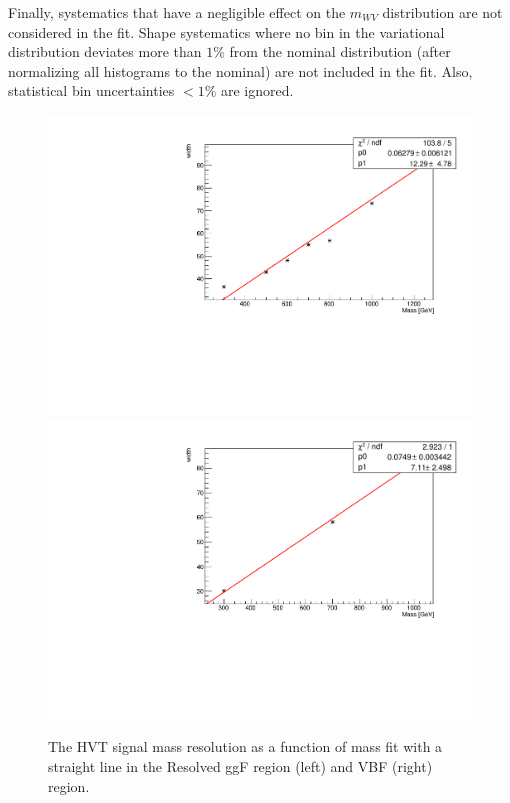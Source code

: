 Finally, systematics that have a negligible effect on the $m_{WV}$ distribution are not considered in the fit. Shape systematics where no bin in the variational distribution deviates more than $1\%$ from the nominal distribution (after normalizing all histograms to the nominal) are not included in the fit. Also, statistical bin uncertainties $< 1\%$ are ignored. 

\begin{figure}[h!]
  \centering
  \includegraphics[width=0.48\hsize]{figures/Analysis/signal_mass_resolution/sigres_resolved_1lephvt.pdf}
    \includegraphics[width=0.48\hsize]{figures/Analysis/signal_mass_resolution/sigres_resolved_1lephvtvbf.pdf}
 \caption{The HVT signal mass resolution as a function of mass fit with a straight line in the Resolved ggF region (left) and VBF (right) region. } 
  \label{fig:resolved_sigwidth}
\end{figure} 
\FloatBarrier

